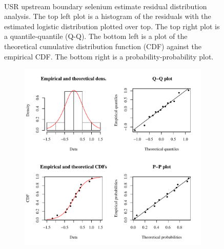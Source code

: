 \begin{linenumbers}
\begin{landscape}
\begin{figure}
\begin{subfigure}{0.7\textwidth}
		\end{subfigure}\\
		\caption[USR upstream boundary selenium estimate residual distribution analysis.]{USR upstream boundary selenium estimate residual distribution analysis.  The top left plot is a histogram of the residuals with the estimated logistic distribution plotted over top.  The top right plot is a quantile-quantile (Q-Q).  The bottom left is a plot of the theoretical cumulative distribution function (CDF) against the empirical CDF.  The bottom right is a probability-probability plot.}
		\label{fig:concRes-Fit_US}
	\end{figure}
\end{landscape}

\subfiguremid
\begin{landscape}
	\begin{figure}
		\begin{subfigure}{0.7\textwidth}
			\centering
			\includegraphics[width=\tableCustomSize]{"Figures/Results_USR/Stochastic/Conc Model res-fit U167"}
		\end{subfigure}%
		\begin{subfigure}{0.7\textwidth}
			\centering

\end{subfigure}
\end{figure}
\end{landscape}
\end{linenumbers}
